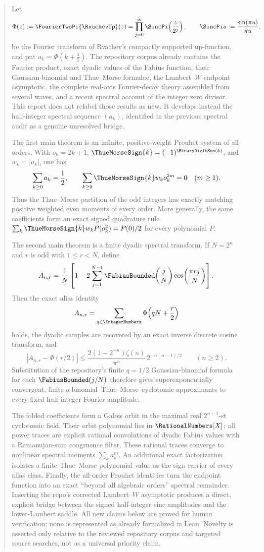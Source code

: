 \documentclass[11pt,oneside]{article}
\theoremstyle{definition}
\theoremstyle{remark}
\newcommand{\PhiU}{\Phi}
\begin{document}
\begin{abstract}
Let
\[
 \PhiU(z):=\FourierTwoPi{\RvachevUp}(z)
 =\prod_{j=0}^{\infty}\SincPi\!\left(\frac z{2^j}\right),
 \qquad \SincPi u:=\frac{\sin(\pi u)}{\pi u},
\]
be the Fourier transform of Rvachev's compactly supported up-function, and put
$a_k=\PhiU(k+\tfrac12)$.  The repository corpus already contains the Fourier
product, exact dyadic values of the Fabius function, their Gaussian-binomial and
Thue--Morse formulae, the Lambert--$W$ endpoint asymptotic, the complete real-axis
Fourier-decay theory assembled from several waves, and a recent spectral account
of the integer zero divisor.  This report does not relabel those results as new.
It develops instead the half-integer spectral sequence $(a_k)$, identified in the
previous spectral audit as a genuine unresolved bridge.

The first main theorem is an infinite, positive-weight Prouhet system of all
orders.  With $o_k=2k+1$, $\ThueMorseSign{k}=(-1)^{\BinaryDigitSum(k)}$, and
$w_k=|a_k|$, one has
\[
 \sum_{k\ge0}a_k=\frac12,
 \qquad
 \sum_{k\ge0}\ThueMorseSign{k} w_k o_k^{2m}=0\quad(m\ge1).
\]
Thus the Thue--Morse partition of the odd integers has exactly matching positive
weighted even moments of every order.  More generally, the same coefficients
form an exact signed quadrature rule
$\sum_k\ThueMorseSign{k}w_kP(o_k^2)=P(0)/2$ for every polynomial $P$.

The second main theorem is a finite dyadic spectral transform.  If $N=2^n$ and
$r$ is odd with $1\le r<N$, define
\[
 A_{n,r}=\frac1N\left[1-2\sum_{j=1}^{N-1}
 \FabiusBounded\!\left(\frac jN\right)\cos\!\left(\frac{\pi rj}{N}\right)\right].
\]
Then the exact alias identity
\[
 A_{n,r}=\sum_{q\in\IntegerNumbers}\PhiU\!\left(qN+\frac r2\right)
\]
holds, the dyadic samples are recovered by an exact inverse discrete cosine
transform, and
\[
 |A_{n,r}-\PhiU(r/2)|\le
 \frac{2(1-2^{-n})\zeta(n)}{\pi^n}\,2^{-n(n-1)/2}
 \qquad(n\ge2).
\]
Substitution of the repository's finite $q=1/2$ Gaussian-binomial formula for
each $\FabiusBounded(j/N)$ therefore gives superexponentially convergent, finite
$q$-binomial--Thue--Morse--cyclotomic approximants to every fixed half-integer
Fourier amplitude.

The folded coefficients form a Galois orbit in the maximal real
$2^{n+1}$-st cyclotomic field.  Their orbit polynomial lies in $\RationalNumbers[X]$; all power
traces are explicit rational convolutions of dyadic Fabius values with a
Ramanujan-sum congruence filter.  These rational traces converge to nonlinear
spectral moments $\sum_k a_k^m$.  An additional exact factorization isolates a
finite Thue--Morse polynomial value as the sign carrier of every alias class.
Finally, the all-order Prouhet identities turn the endpoint function into an
exact ``beyond all algebraic orders'' spectral remainder.  Inserting the
repo's corrected Lambert--$W$ asymptotic produces a direct, explicit bridge
between the signed half-integer sinc amplitudes and the lower-Lambert saddle.
All new claims below are proved for human verification; none is represented as
already formalized in Lean.  Novelty is asserted only relative to the reviewed
repository corpus and targeted source searches, not as a universal priority
claim.
\end{abstract}
\end{document}
